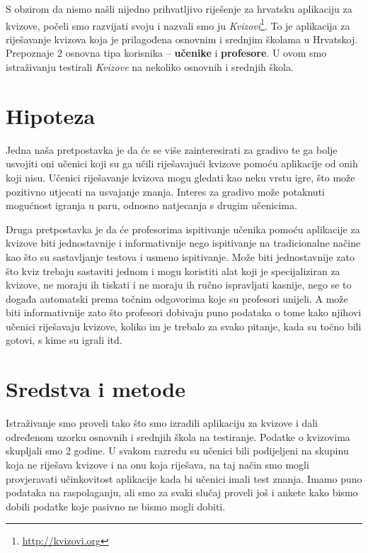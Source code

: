 \documentclass{scrreprt}
\begin{document}
S obzirom da nismo našli nijedno prihvatljivo riješenje za hrvatsku aplikaciju
za kvizove, počeli smo razvijati svoju i nazvali smo ju
\emph{Kvizovi}\footnote{\url{http://kvizovi.org}}. To je aplikacija za
riješavanje kvizova koja je prilagođena osnovnim i srednjim školama u Hrvatskoj.
Prepoznaje 2 osnovna tipa korisnika -- \textbf{učenike} i \textbf{profesore}. U
ovom smo istraživanju testirali \emph{Kvizove} na nekoliko osnovnih i srednjih
škola.

\chapter{Hipoteza}

Jedna naša pretpostavka je da će se više zainteresirati za gradivo te ga bolje
usvojiti oni učenici koji su ga učili riješavajući kvizove pomoću aplikacije od
onih koji nisu. Učenici riješavanje kvizova mogu gledati kao neku vrstu igre,
što može pozitivno utjecati na usvajanje znanja. Interes za gradivo može
potaknuti mogućnost igranja u paru, odnosno natjecanja s drugim učenicima.

Druga pretpostavka je da će profesorima ispitivanje učenika pomoću aplikacije za
kvizove biti jednostavnije i informativnije nego ispitivanje na tradicionalne
načine kao što su sastavljanje testova i usmeno ispitivanje. Može biti
jednostavnije zato što kviz trebaju sastaviti jednom i mogu koristiti alat koji
je specijaliziran za kvizove, ne moraju ih tiskati i ne moraju ih ručno
ispravljati kasnije, nego se to događa automatski prema točnim odgovorima koje
su profesori unijeli. A može biti informativnije zato što profesori dobivaju
puno podataka o tome kako njihovi učenici riješavaju kvizove, koliko im je
trebalo za svako pitanje, kada su točno bili gotovi, s kime su igrali itd.

\chapter{Sredstva i metode}

Istraživanje smo proveli tako što smo izradili aplikaciju za kvizove i dali
određenom uzorku osnovnih i srednjih škola na testiranje. Podatke o kvizovima
skupljali smo 2 godine. U svakom razredu su učenici bili podijeljeni na skupinu
koja ne riješava kvizove i na onu koja riješava, na taj način smo mogli
provjeravati učinkovitost aplikacije kada bi učenici imali test znanja. Imamo
puno podataka na raspolaganju, ali smo za svaki slučaj proveli još i ankete kako
bismo dobili podatke koje pasivno ne bismo mogli dobiti.
\end{document}
